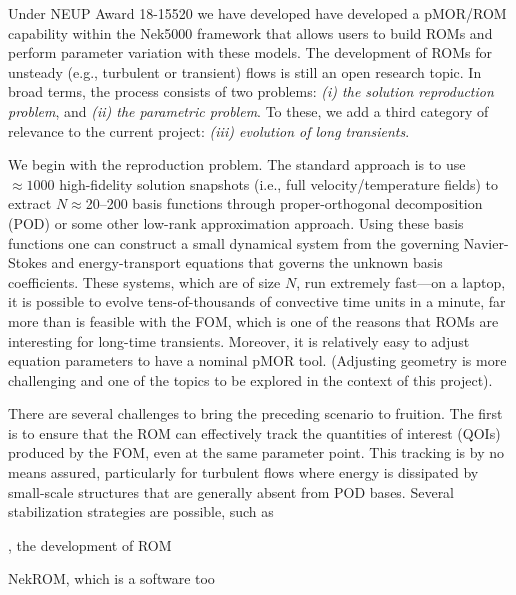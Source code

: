 Under NEUP Award 18-15520 we have developed have developed a pMOR/ROM
capability within the Nek5000 framework that allows users to build ROMs and
perform parameter variation with these models.  The development of ROMs for
unsteady (e.g., turbulent or transient) flows is still an open research topic.
In broad terms, the process consists of two problems: {\em (i) the solution
reproduction problem}, and {\em (ii) the parametric problem}.  To these, we add
a third category of relevance to the current project: {\em (iii) evolution
of long transients}.

We begin with the reproduction problem. The standard approach is to use
$\approx 1000$ high-fidelity solution snapshots (i.e., full velocity/temperature
fields) to extract $N$$\approx$20--200 basis functions through 
proper-orthogonal decomposition (POD) or some other low-rank approximation
approach.  Using these basis functions one can construct a small
dynamical system from the governing Navier-Stokes and energy-transport
equations that governs the unknown basis coefficients.  These systems,
which are of size $N$, run extremely fast---on a laptop, it is possible
to evolve tens-of-thousands of convective time units in a minute, far more than
is feasible with the FOM, which is one of the reasons that ROMs are interesting
for long-time transients.  Moreover, it is relatively easy to adjust equation
parameters to have a nominal pMOR tool.  (Adjusting geometry is more
challenging and one of the topics to be explored in the context of this
project).

There are several challenges to bring the preceding scenario to fruition.
The first is to ensure that the ROM can effectively track the quantities
of interest (QOIs) produced by the FOM, even at the same parameter point.
This tracking is by no means assured, particularly for turbulent flows
where energy is dissipated by small-scale structures that are generally
absent from POD bases.  Several stabilization strategies are possible,
such as 












, the development of ROM








NekROM, which is a software
too

